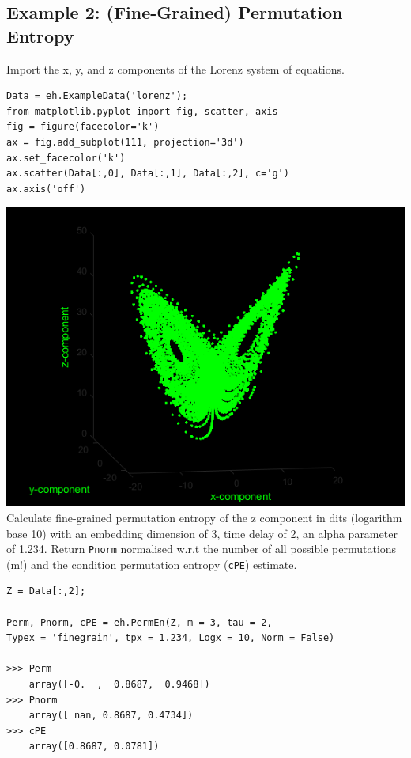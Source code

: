 \documentclass[12pt, a4paper, titlepage, openany]{book}
\begin{document}
\subsection{\normalsize Example 2: \hspace{15mm} (Fine-Grained) Permutation Entropy}
\noindent Import the x, y, and z components of the Lorenz system of equations.
\begin{verbatim}
Data = eh.ExampleData('lorenz');
from matplotlib.pyplot import fig, scatter, axis
fig = figure(facecolor='k')
ax = fig.add_subplot(111, projection='3d')
ax.set_facecolor('k')
ax.scatter(Data[:,0], Data[:,1], Data[:,2], c='g')
ax.axis('off')
\end{verbatim}
\includegraphics[scale=.4]{lorenz.png}\newline \newline
\noindent Calculate fine-grained permutation entropy of the z component in dits (logarithm base 10) with an embedding dimension of 3, time delay of 2, an alpha parameter of 1.234. Return \texttt{Pnorm} normalised w.r.t the number of all possible permutations (m!) and the condition permutation entropy (\texttt{cPE}) estimate.
\begin{verbatim}
Z = Data[:,2];

Perm, Pnorm, cPE = eh.PermEn(Z, m = 3, tau = 2, 
Typex = 'finegrain', tpx = 1.234, Logx = 10, Norm = False)

>>> Perm
	array([-0.  ,  0.8687,  0.9468])
>>> Pnorm
	array([ nan, 0.8687, 0.4734])
>>> cPE
	array([0.8687, 0.0781])
\end{verbatim}
\end{document}
